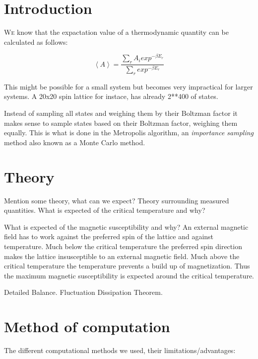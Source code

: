 \documentclass[twoside]{article}
\begin{document}
\begin{multicols}{2} %

\section{Introduction}

\lettrine[nindent=0em,lines=1]{W}e know that the expactation value of a thermodynamic quantity can be calculated as follows: 

\def\mean#1{\left< #1 \right>}

\begin{equation}  \mean{A} = \frac{\sum_{r} A_i exp^{-\beta E_r}}{\sum_{r} exp^{-\beta E_r}}
\end{equation}

\hfill

This might be possible for a small system but becomes very impractical for larger systems. A 20x20 spin lattice for instace, has already 2**400 of states.

Instead of sampling all states and weighing them by their Boltzman factor it makes sense to sample states based on their Boltzman factor, weighing them equally. This is what is done in the Metropolis algorithm, an \emph{importance sampling} method also known as a Monte Carlo method. 


\section{Theory}
Mention some theory, what can we expect?
Theory surrounding measured quantities. What is expected of the critical temperature and why? 


What is expected of the magnetic susceptibility and why?
An external magnetic field has to work against the preferred spin of the lattice and against temperature. Much below the critical temperature the preferred spin direction makes the lattice insusceptible to an external magnetic field. Much above the critical temperature the temperature prevents a build up of magnetization. Thus the maximum magnetic susceptibility is expected around the critical temperature.

Detailed Balance. Fluctuation Dissipation Theorem.



\section{Method of computation}
The different computational methods we used, their limitations/advantages: 


\end{multicols}
\end{document}
